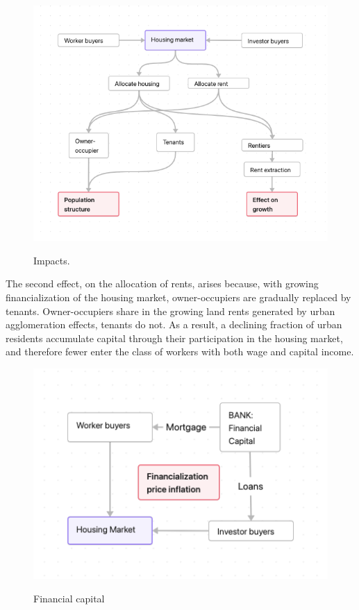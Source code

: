 \begin{figure}[!ht]
    \centering
    \includegraphics[scale=.60]{fig/flow_impacts.png}
    \label{Figure-impacts}
\caption{Impacts.}
\end{figure}

The second effect, on the allocation of rents, arises because, with growing financialization of the housing market, owner-occupiers are gradually replaced by tenants.  Owner-occupiers share in the growing land rents generated by urban agglomeration effects, tenants do not. As a result, a declining fraction of urban residents accumulate capital through their participation in the housing market, and therefore fewer enter the class of workers with both wage and capital income. 

\begin{figure}[!ht]
    \centering
    \includegraphics[scale=.70]{fig/flow_financialization.png}
    \label{fig-financial-cycle}
    \caption{Financial capital}
\end{figure}


